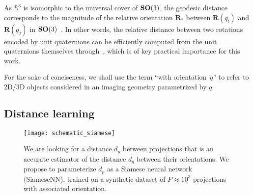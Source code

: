 As $\mathbb{S}^3$ is isomorphic to the universal cover of $\mathrm{\mathbf{SO}}(3)$, the geodesic distance corresponds to the magnitude of the relative orientation $\mathbf{R}_*$ between $\mathbf{R}(q_i)$ and $\mathbf{R}(q_j)$ in $\mathrm{\mathbf{SO}}(3)$~\cite{huynh2009metrics}.
In other words, the relative distance between two rotations encoded by unit quaternions can be efficiently computed from the unit quaternions themselves through~, which is of key practical importance for this work.

For the sake of conciseness, we shall use the term ``with orientation~$q$'' to refer to 2D/3D objects considered in an imaging geometry parametrized by $q$.

\subsection{Distance learning}%

\begin{figure}
    \centering
    \texttt{[image: schematic\_siamese]}
    \caption{
        We are looking for a distance $d_p$ between projections that is an accurate estimator of the distance $d_q$ between their orientations.
        We propose to parameterize $d_p$ as a Siamese neural network (SiameseNN), trained on a synthetic dataset of $P \approx 10^3$ projections with associated orientation.
}
    \label{fig:schematic:distance-learning}
\end{figure}

